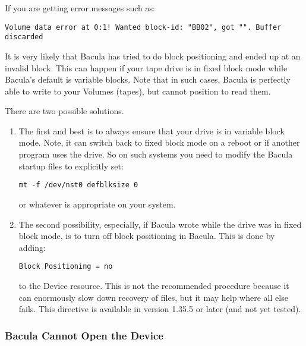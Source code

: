 If you are getting error messages such as: 

\footnotesize
\begin{verbatim}
Volume data error at 0:1! Wanted block-id: "BB02", got "". Buffer discarded
\end{verbatim}
\normalsize

It is very likely that Bacula has tried to do block positioning and ended up
at an invalid block. This can happen if your tape drive is in fixed block mode
while Bacula's default is variable blocks. Note that in such cases, Bacula is
perfectly able to write to your Volumes (tapes), but cannot position to read
them. 

There are two possible solutions. 

\begin{enumerate}
\item The first and  best is to always ensure that your drive is in  variable
   block mode. Note, it can switch back to  fixed block mode on a reboot or if
   another program  uses the drive. So on such systems you  need to modify the
Bacula startup files  to explicitly set: 

\footnotesize
\begin{verbatim}
mt -f /dev/nst0 defblksize 0
\end{verbatim}
\normalsize

or whatever is appropriate on your system.  
\item The second possibility, especially, if Bacula wrote  while the drive was
   in fixed block mode, is to turn  off block positioning in Bacula. This is done
   by  adding: 

\footnotesize
\begin{verbatim}
Block Positioning = no
\end{verbatim}
\normalsize

to the Device resource. This is not the recommended  procedure because it can
enormously slow down  recovery of files, but it may help where all else 
fails. This directive is available in version 1.35.5  or later (and not yet
tested).  
\end{enumerate}

\label{opendevice}

\subsubsection*{Bacula Cannot Open the Device}

